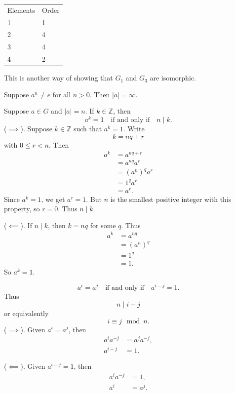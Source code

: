 \begin{example}[$G_3=\mathbb{Z}_5^*$]
    \begin{tabular}{ll}
        Elements & Order \\
        1 & 1 \\
        2 & 4 \\
        3 & 4 \\
        4 & 2
    \end{tabular}
\end{example}

This is another way of showing that $G_1$ and $G_3$ are isomorphic.

\begin{corollary}{
    Suppose $a^n\neq e$ for all $n>0$.
    Then $|a|=\infty$.
}
\end{corollary}

\begin{theorem}{
    Suppose $a\in G$ and $|a|=n$.
    If $k\in\mathbb{Z}$, then
    \[
        a^k=1
        \quad\text{if and only if}\quad
        n\mid k.
    \]
}
    ($\implies$).
    Suppose $k\in\mathbb{Z}$ such that $a^k=1$.
Write
    \[
        k=nq+r
    \]
    with $0\leq r<n$.
    Then
    \begin{align*}
        a^k &= a^{nq+r}\\
        &= a^{nq}a^r\\
        &= (a^n)^q a^r\\
        &= 1^q a^r\\
        &= a^r.
    \end{align*}
    Since $a^k=1$, we get $a^r=1$.
    But $n$ is the smallest positive integer with this property, so $r=0$.
    Thus $n\mid k$.

    ($\impliedby$).
    If $n\mid k$, then $k=nq$ for some $q$.
    Thus
    \begin{align*}
        a^k &= a^{nq}\\
        &= (a^n)^q\\
        &= 1^q\\
        &= 1.
    \end{align*}
    So $a^k=1$.
\end{theorem}

\begin{corollary}{
    \[
        a^i=a^j
        \quad\text{if and only if}\quad
        a^{i-j}=1.
    \]
    Thus
    \[
        n\mid i-j
    \]
    or equivalently
    \[
        i\equiv j\mod n.
    \]
}
($\implies$).
    Given $a^i=a^j$, then
    \begin{align*}
        a^i a^{-j} &= a^j a^{-j},\\
        a^{i-j} &= 1.
    \end{align*}

    ($\impliedby$).
    Given $a^{i-j}=1$, then
    \begin{align*}
        a^i a^{-j} &= 1,\\
        a^i &= a^j.
    \end{align*}
\end{corollary}

